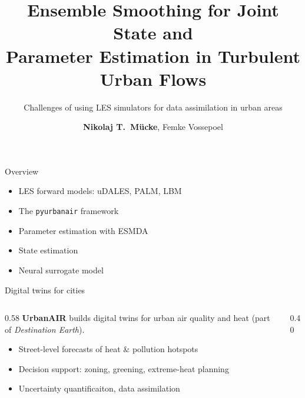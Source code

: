 \documentclass[aspectratio=169,11pt]{beamer}
\title{Ensemble Smoothing for Joint State and\\Parameter Estimation in Turbulent Urban Flows}
\subtitle{Challenges of using LES simulators for data assimilation in urban areas}
\author{\textbf{Nikolaj T.\ M\"ucke}, Femke Vossepoel}
\institute{TU Delft \,$\cdot$\, UrbanAIR project}
\begin{document}
\uatitlepage

\begin{frame}{Overview}
  \begin{itemize}\setlength\itemsep{11pt}
    \item LES forward models: uDALES, PALM, LBM
    \item The \texttt{pyurbanair} framework
    \item Parameter estimation with ESMDA
    \item State estimation
    \item Neural surrogate model
  \end{itemize}
\end{frame}

\begin{frame}{Digital twins for cities}
  \begin{columns}[T]
    \begin{column}{0.58\textwidth}
      \textbf{UrbanAIR} builds digital twins for urban air
      quality and heat (part of \emph{Destination Earth}).
      \smallskip
      \begin{itemize}\setlength\itemsep{6pt}
        \item Street-level forecasts of heat \& pollution hotspots
        \item Decision support: zoning, greening, extreme-heat planning
        \item Uncertainty quantificaiton, data assimilation
      \end{itemize}
    \end{column}
    \begin{column}{0.40\textwidth}
    \end{column}
  \end{columns}
\end{frame}
\end{document}
